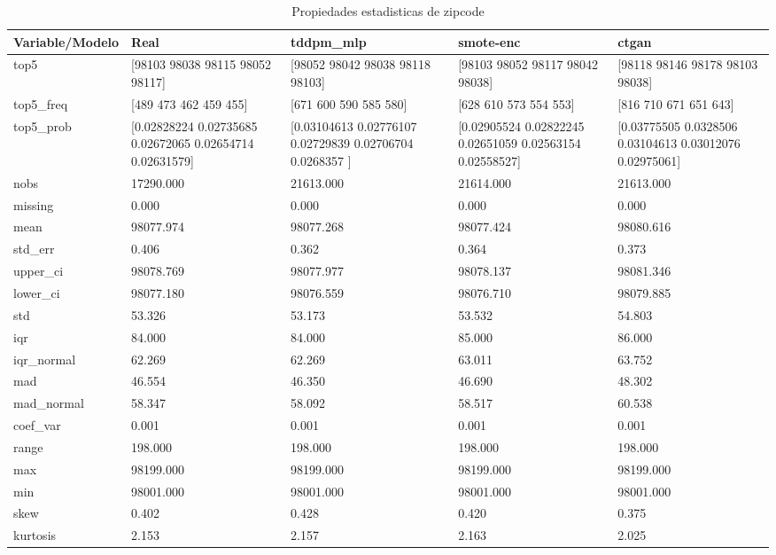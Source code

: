 \begin{table}[H]
\centering
\caption{Propiedades  estadisticas de zipcode}
\label{table-stats-zipcode}
\begin{tabular}{|l|m{10em}|m{10em}|m{10em}|m{10em}|}
\hline
 \rowcolor[gray]{0.8}
Variable/Modelo & Real & tddpm\_mlp & smote-enc & ctgan \\
\hline top5 & [98103 98038 98115 98052 98117] & [98052 98042 98038 98118 98103] & [98103 98052 98117 98042 98038] & [98118 98146 98178 98103 98038] \\
\hline top5\_freq & [489 473 462 459 455] & [671 600 590 585 580] & [628 610 573 554 553] & [816 710 671 651 643] \\
\hline top5\_prob & [0.02828224 0.02735685 0.02672065 0.02654714 0.02631579] & [0.03104613 0.02776107 0.02729839 0.02706704 0.0268357 ] & [0.02905524 0.02822245 0.02651059 0.02563154 0.02558527] & [0.03775505 0.0328506  0.03104613 0.03012076 0.02975061] \\
\hline nobs & 17290.000 & 21613.000 & 21614.000 & 21613.000 \\
\hline missing & 0.000 & 0.000 & 0.000 & 0.000 \\
\hline mean & 98077.974 & 98077.268 & 98077.424 & 98080.616 \\
\hline std\_err & 0.406 & 0.362 & 0.364 & 0.373 \\
\hline upper\_ci & 98078.769 & 98077.977 & 98078.137 & 98081.346 \\
\hline lower\_ci & 98077.180 & 98076.559 & 98076.710 & 98079.885 \\
\hline std & 53.326 & 53.173 & 53.532 & 54.803 \\
\hline iqr & 84.000 & 84.000 & 85.000 & 86.000 \\
\hline iqr\_normal & 62.269 & 62.269 & 63.011 & 63.752 \\
\hline mad & 46.554 & 46.350 & 46.690 & 48.302 \\
\hline mad\_normal & 58.347 & 58.092 & 58.517 & 60.538 \\
\hline coef\_var & 0.001 & 0.001 & 0.001 & 0.001 \\
\hline range & 198.000 & 198.000 & 198.000 & 198.000 \\
\hline max & 98199.000 & 98199.000 & 98199.000 & 98199.000 \\
\hline min & 98001.000 & 98001.000 & 98001.000 & 98001.000 \\
\hline skew & 0.402 & 0.428 & 0.420 & 0.375 \\
\hline kurtosis & 2.153 & 2.157 & 2.163 & 2.025 \\

\end{tabular}
\end{table}

